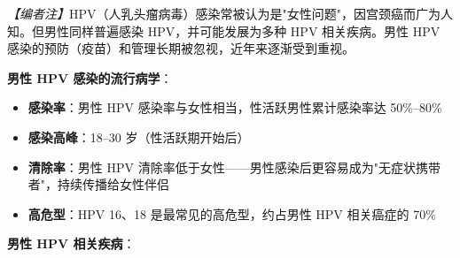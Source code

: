 \noindent\textit{【编者注】}HPV（人乳头瘤病毒）感染常被认为是"女性问题"，因宫颈癌而广为人知。但男性同样普遍感染 HPV，并可能发展为多种 HPV 相关疾病。男性 HPV 感染的预防（疫苗）和管理长期被忽视，近年来逐渐受到重视。

\vspace{0.5em}
\noindent\textbf{男性 HPV 感染的流行病学}：

\begin{itemize}[leftmargin=2cm]
	\item \textbf{感染率}：男性 HPV 感染率与女性相当，性活跃男性累计感染率达 50\%--80\%
	\item \textbf{感染高峰}：18--30 岁（性活跃期开始后）
	\item \textbf{清除率}：男性 HPV 清除率低于女性——男性感染后更容易成为"无症状携带者"，持续传播给女性伴侣
	\item \textbf{高危型}：HPV 16、18 是最常见的高危型，约占男性 HPV 相关癌症的 70\%
\end{itemize}

\vspace{0.5em}
\noindent\textbf{男性 HPV 相关疾病}：

